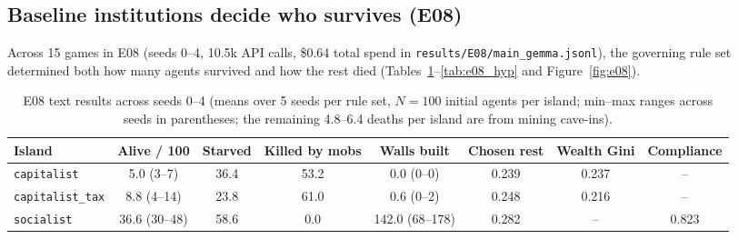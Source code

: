 \documentclass[10pt,letterpaper]{article}
\begin{document}
\subsection{Baseline institutions decide who survives (E08)}\label{sec:e08}

Across 15 games in E08 (seeds 0--4, 10.5k API calls, \$0.64 total spend in \texttt{results/E08/main\_gemma.jsonl}), the governing rule set determined both how many agents survived and how the rest died (Tables~\ref{tab:e08_results}--\ref{tab:e08_hyp} and Figure~\ref{fig:e08}).

\begin{table}[!htb]
\centering
\caption{E08 text results across seeds 0--4 (means over 5 seeds per rule set, $N = 100$ initial agents per island; min--max ranges across seeds in parentheses; the remaining 4.8--6.4 deaths per island are from mining cave-ins).}
\label{tab:e08_results}
\footnotesize
\setlength{\tabcolsep}{3pt}
\begin{tabular*}{\textwidth}{@{\extracolsep{\fill}}lccccccc@{}}
\toprule
\textbf{Island} & \textbf{Alive / 100} & \textbf{Starved} & \textbf{Killed by mobs} & \textbf{Walls built} & \textbf{Chosen rest} & \textbf{Wealth Gini} & \textbf{Compliance} \\
\midrule
\texttt{capitalist} & 5.0 (3--7) & 36.4 & 53.2 & 0.0 (0--0) & 0.239 & 0.237 & -- \\
\texttt{capitalist\_tax} & 8.8 (4--14) & 23.8 & 61.0 & 0.6 (0--2) & 0.248 & 0.216 & -- \\
\texttt{socialist} & 36.6 (30--48) & 58.6 & 0.0 & 142.0 (68--178) & 0.282 & -- & 0.823 \\
\bottomrule
\end{tabular*}
\end{table}
\end{document}
